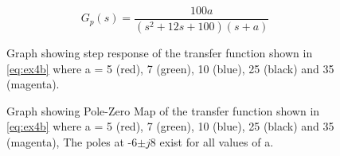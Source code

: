 \renewcommand{\ex}{ex4b} 

\begin{equation}
	G_{p}\left(s\right)=\frac{100a}{\left(s^2 + 12s + 100\right)\left(s+a\right)}
	\label{eq:\ex}
\end{equation}

\begin{figure}[ht!]
    \centering
    
    \caption{Graph showing step response of the transfer function shown in \eqref{eq:\ex} where a = 5 (red), 7 (green), 10 (blue), 25 (black) and 35 (magenta).\appendixamble{\ex}}
    \label{fig:\ex}
\end{figure}\FloatBarrier

\begin{figure}[ht!]
    \centering
    
    \caption{Graph showing Pole-Zero Map of the transfer function shown in \eqref{eq:\ex} where a = 5 (red), 7 (green), 10 (blue), 25 (black) and 35 (magenta), The poles at -6$\pm j8$ exist for all values of a. \appendixamble{\ex}}
    \label{fig:\ex_2}
\end{figure}\FloatBarrier

